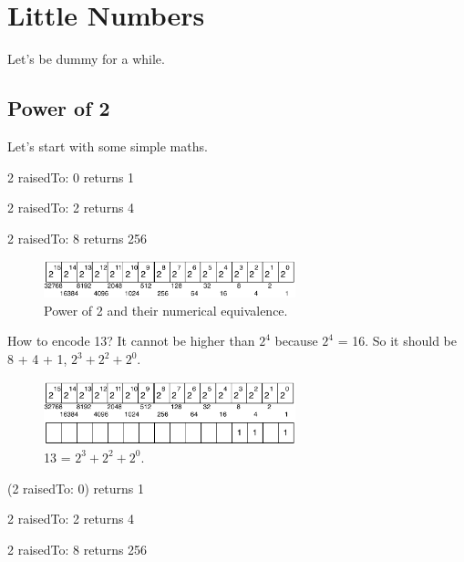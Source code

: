 \documentclass[a4paper,10pt,twoside]{book}
\begin{document}
\fi
\sloppy

\chapter{Little Numbers}




Let's be dummy for a while.

\section{Power of 2}

Let's start with some simple maths. 

\begin{code}{}
2 raisedTo: 0
	returns 1

2 raisedTo: 2
	returns 4
	
2 raisedTo: 8
	returns 256
\end{code}

\begin{figure}[h]
\begin{center}
\includegraphics[width=0.65\textwidth]{16bits-number}
\caption{Power of 2 and their numerical equivalence.}
\end{center}
\end{figure}

How to encode 13? It cannot be higher than $2^{4}$ because $2^{4}$ = 16. So it should be 8 + 4 + 1, $2^{3} + 2^{2} + 2^{0}$.

\begin{figure}[h]
\begin{center}
\includegraphics[width=0.65\textwidth]{16bits-number13}
\caption{13 = $2^{3} + 2^{2} + 2^{0}$.}
\end{center}
\end{figure}


\begin{code}{}
(2 raisedTo: 0)
	returns 1

2 raisedTo: 2
	returns 4
	
2 raisedTo: 8
	returns 256
\end{code}
\end{document}
